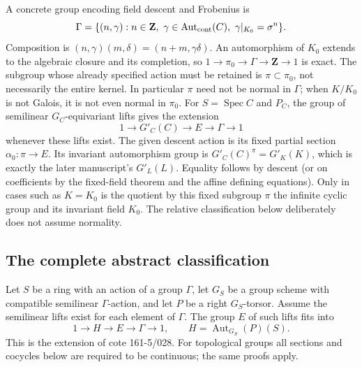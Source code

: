 A concrete group encoding field descent and Frobenius is
\[
 \Gamma=\{(n,\gamma):n\in\mathbf Z,
   \ \gamma\in\operatorname{Aut}_{\rm cont}(C),
   \ \gamma|_{K_0}=\sigma^n\}.
\]
Composition is $(n,\gamma)(m,\delta)=(n+m,\gamma\delta)$.
An automorphism of $K_0$ extends to the algebraic closure and its
completion, so
$1\to\pi_0\to\Gamma\to\mathbf Z\to1$ is exact.
The subgroup whose already specified action must be retained is
$\pi\subset\pi_0$, not necessarily the entire kernel.
In particular $\pi$ need not be normal in $\Gamma$; when $K/K_0$
is not Galois, it is not even normal in $\pi_0$.
For $S=\operatorname{Spec}C$ and $P_C$, the group of semilinear
$G_C$-equivariant lifts gives the extension
\[
 1\longrightarrow G'_C(C)\longrightarrow E\longrightarrow\Gamma
 \longrightarrow1
\]
whenever these lifts exist.  The given descent action is its fixed
partial section $\alpha_0:\pi\to E$.
Its invariant automorphism group is
$G'_C(C)^\pi=G'_K(K)$, which is exactly the later manuscript's
$G'_L(L)$.  Equality follows by descent (or on coefficients by the
fixed-field theorem and the affine defining equations).
Only in cases such as $K=K_0$ is the quotient by this fixed subgroup
$\pi$ the infinite cyclic group and its invariant field $K_0$.
The relative classification below deliberately does not assume
normality.

\subsection{The complete abstract classification}
Let $S$ be a ring with an action of a group $\Gamma$, let $G_S$ be a group
scheme with compatible semilinear $\Gamma$-action, and let $P$ be a right
$G_S$-torsor.  Assume the semilinear lifts exist for each element of
$\Gamma$.  The group $E$ of such lifts fits into
\[
 1\longrightarrow H\longrightarrow E\longrightarrow\Gamma
 \longrightarrow1,\qquad H=\operatorname{Aut}_{G_S}(P)(S).
\]
This is the extension of cote 161-5/028.  For topological groups all sections
and cocycles below are required to be continuous; the same proofs apply.

